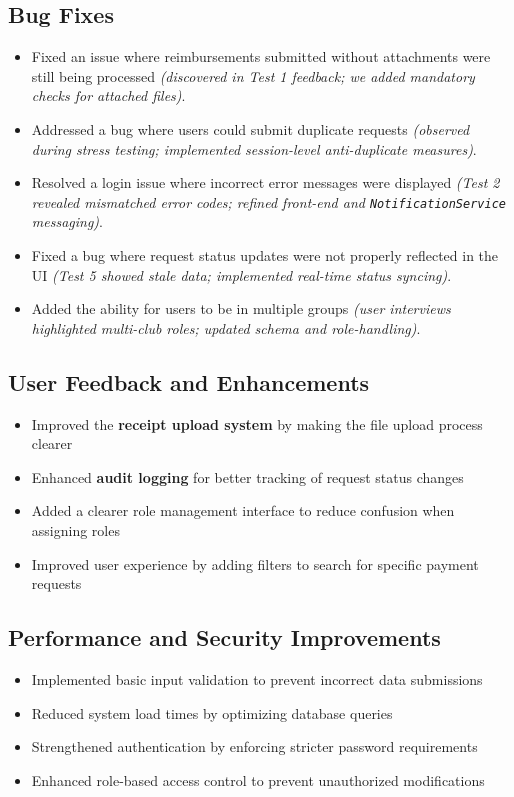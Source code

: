 \documentclass[12pt, titlepage]{article}
\begin{document}
\subsection{Bug Fixes}
\begin{itemize}
  \item Fixed an issue where reimbursements submitted without attachments were 
  still being processed 
  \emph{(discovered in Test 1 feedback; we added mandatory checks for 
  attached files)}.
  \item Addressed a bug where users could submit duplicate requests 
  \emph{(observed during stress testing; implemented session-level 
  anti-duplicate measures)}.
  \item Resolved a login issue where incorrect error messages were displayed 
  \emph{(Test 2 revealed mismatched error codes; refined front-end and 
  \texttt{NotificationService} messaging)}.
  \item Fixed a bug where request status updates were not properly reflected in 
  the UI \emph{(Test 5 showed stale data; implemented real-time status syncing)}.
  \item Added the ability for users to be in multiple groups 
  \emph{(user interviews highlighted multi-club roles; updated schema and 
  role-handling)}.
\end{itemize}



\subsection{User Feedback and Enhancements}
\begin{itemize}
  \item Improved the \textbf{receipt upload system} by making the file upload 
  process clearer 
  \item Enhanced \textbf{audit logging} for better tracking of request status 
  changes 
  \item Added a clearer role management interface to reduce confusion when 
  assigning roles 
  \item Improved user experience by adding filters to search for specific 
  payment requests
\end{itemize}

\subsection{Performance and Security Improvements}
\begin{itemize}
  \item Implemented basic input validation to prevent incorrect data submissions 
  \item Reduced system load times by optimizing database queries 
  \item Strengthened authentication by enforcing stricter password requirements 
  \item Enhanced role-based access control to prevent unauthorized modifications
\end{itemize}
\end{document}
